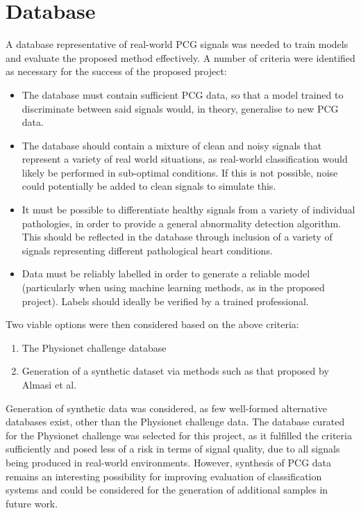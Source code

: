 \documentclass[titlepage, 12pt]{scrartcl} \usepackage{enumitem}
\begin{document}
\section{Database}\label{Database}
A database representative of real-world PCG signals was needed to train models
and evaluate the proposed method effectively.  A number of criteria were
identified as necessary for the success of the proposed project:
\begin{itemize}
    \item The database must contain sufficient PCG data, so that a model
        trained to discriminate between said signals would, in theory, generalise
        to new PCG data.
    \item The database should contain a mixture of clean and noisy signals that
        represent a variety of real world situations, as real-world
        classification would likely be performed in sub-optimal conditions. If
        this is not possible, noise could potentially be added to clean signals
        to simulate this.
    \item It must be possible to differentiate healthy signals from a variety of
        individual pathologies, in order to provide a general abnormality
        detection algorithm. This should be reflected in the database through
        inclusion of a variety of signals representing different pathological
        heart conditions.
    \item Data must be reliably labelled in order to generate a reliable model
        (particularly when using machine learning methods, as in the proposed
        project). Labels should ideally be verified by a trained professional.
\end{itemize}
\noindent
Two viable options were then considered based on the above criteria:
\begin{enumerate}
    \item The Physionet challenge database
    \item Generation of a synthetic dataset via methods such as that proposed
    by Almasi et al.~\parencite{Almasi2011}
\end{enumerate}

Generation of synthetic data was considered, as few well-formed alternative
databases exist, other than the Physionet challenge data. The database curated
for the Physionet challenge was selected for this project, as it fulfilled the
criteria sufficiently and posed less of a risk in terms of signal quality, due
to all signals being produced in real-world environments. However, synthesis
of PCG data remains an interesting possibility for improving evaluation of
classification systems and could be considered for the generation of additional
samples in future work.
\end{document}
